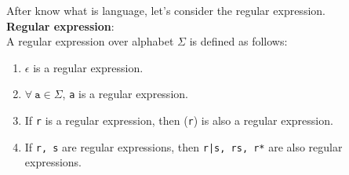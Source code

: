 \documentclass{article}
\begin{document}
After know what is language, let's consider the regular expression.
\\

\textbf{Regular expression}:
\\

A regular expression over alphabet \( \Sigma \) is defined as follows:

\begin{enumerate}
    \item \( \epsilon \) is a regular expression.
    \item \( \forall\ \texttt{a} \in \Sigma \), \texttt{a} is a regular expression.
    \item If \texttt{r} is a regular expression, then (\texttt{r}) is also a regular expression.
    \item If \texttt{r, s} are regular expressions, then \texttt{r|s, rs, r*} are also regular expressions.
\end{enumerate}



\pagebreak
\end{document}
